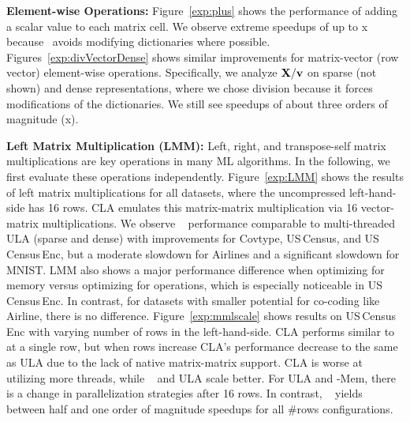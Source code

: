 \textbf{Element-wise Operations:} Figure~\ref{exp:plus} shows the performance of adding a scalar value to each matrix cell. We observe extreme speedups of up to x because \name\ avoids modifying dictionaries where possible. Figures~\ref{exp:divVectorDense} shows similar improvements for matrix-vector (row vector) element-wise operations. Specifically, we analyze $\mathbf{X}/\mathbf{v}$ on sparse (not shown) and dense representations, where we chose division because it forces modifications of the dictionaries. We still see speedups of about three orders of magnitude (x).

\textbf{Left Matrix Multiplication (LMM):}
Left, right, and transpose-self matrix multiplications are key operations in many ML algorithms.
In the following, we first evaluate these operations independently.
Figure~\ref{exp:LMM} shows the results of left matrix multiplications for all datasets, where the uncompressed left-hand-side has 16 rows.
CLA emulates this matrix-matrix multiplication via 16 vector-matrix multiplications.
We observe \name~ performance comparable to multi-threaded ULA (sparse and dense) with improvements
for Covtype, US\,Census, and US\,Census\,Enc,
but a moderate slowdown for Airlines and a significant slowdown for MNIST.
LMM also shows a major performance difference when optimizing for memory versus optimizing for operations, which is especially noticeable in US\,Census\,Enc.
In contrast, for datasets with smaller potential for co-coding like Airline, there is no difference.
Figure~\ref{exp:mmlscale} shows results on US\,Census\,Enc with varying number of rows in the left-hand-side.
CLA performs similar to \name~ at a single row, but when rows increase CLA's performance decrease to the same as ULA due to the lack of native matrix-matrix support.
CLA is worse at utilizing more threads, while \name~ and ULA scale better.
For ULA and \name-Mem, there is a change in parallelization strategies after 16 rows.
In contrast, \name~ yields between half and one order of magnitude speedups for all \#rows configurations.


